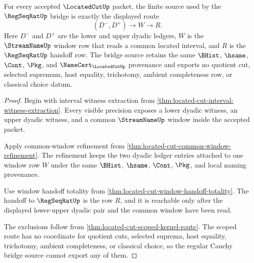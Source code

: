 \begin{theorem}
\label{thm:located-cut-regular-cauchy-bridge-source}
For every accepted $\LocatedCutUp$ packet, the finite source used by the $\RegSeqRatUp$ bridge is exactly the displayed route
$$
(D^{-},D^{+}) \longrightarrow W \longrightarrow R .
$$
Here $D^{-}$ and $D^{+}$ are the lower and upper dyadic ledgers, $W$ is the $\StreamNameUp$ window row that reads a common located interval, and $R$ is the $\RegSeqRatUp$ handoff row. The bridge source retains the same $\BHist$, $\hsame$, $\Cont$, $\Pkg$, and $\NameCert_{\LocatedCutUp}$ provenance and exports no quotient cut, selected supremum, host equality, trichotomy, ambient completeness row, or classical choice datum.
\end{theorem}
\begin{proof}
Begin with interval witness extraction from \autoref{thm:located-cut-interval-witness-extraction}. Every visible precision exposes a lower dyadic witness, an upper dyadic witness, and a common $\StreamNameUp$ window inside the accepted packet.

Apply common-window refinement from \autoref{thm:located-cut-common-window-refinement}. The refinement keeps the two dyadic ledger entries attached to one window row $W$ under the same $\BHist$, $\hsame$, $\Cont$, $\Pkg$, and local naming provenance.

Use window handoff totality from \autoref{thm:located-cut-window-handoff-totality}. The handoff to $\RegSeqRatUp$ is the row $R$, and it is reachable only after the displayed lower-upper dyadic pair and the common window have been read.

The exclusions follow from \autoref{thm:located-cut-scoped-kernel-route}. The scoped route has no coordinate for quotient cuts, selected suprema, host equality, trichotomy, ambient completeness, or classical choice, so the regular Cauchy bridge source cannot export any of them.
\end{proof}

